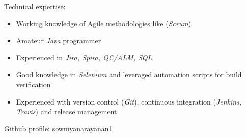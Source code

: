
\inlineheadsection  %
  {Technical expertise:}
 {
 \emph{}
  \begin{itemize}
      \item Working knowledge of Agile methodologies like (\emph{Scrum})
      \item Amateur \emph{Java} programmer
      \item Experienced in \emph{Jira, Spira, QC/ALM, SQL}.
      \item Good knowledge in \emph{Selenium} and leveraged automation scripts for build verification
      \item Experienced with version control (\emph{Git}), continuous integration (\emph{Jenkins, Travis}) and release management
  \end{itemize}
  }
\vspace{0.5em}

\inlineheadsection
  {\href{https://github.com/sowmyanarayanan1}{Github profile: sowmyanarayanan1}}
  {}
